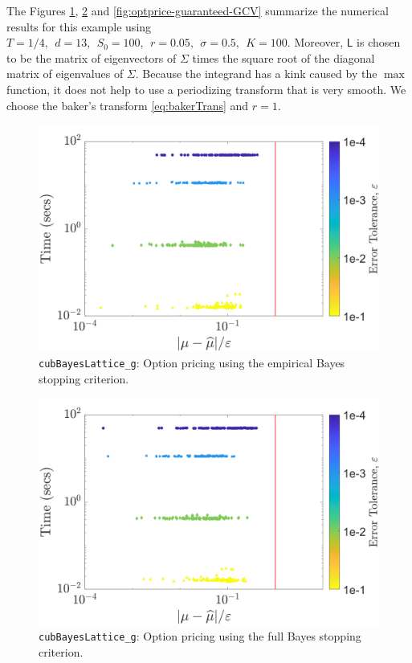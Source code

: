 \documentclass{iitthesis}          %
\newcommand{\mSigma}{\mathsf{\Sigma}}
\newcommand{\mL}{\mathsf{L}}
\newcommand{\code}[1]{\texttt{#1}}
\begin{document}
The Figures \ref{fig:optprice-guaranteed-MLE}, \ref{fig:optprice-guaranteed-FB} and 
\ref{fig:optprice-guaranteed-GCV} summarize the numerical results for this example using
$
T = 1/4, \ \ d = 13, \ \ S_0 = 100, \ \ r =  0.05, \ \ \sigma = 0.5, \ \ K = 100.
$
Moreover, $\mL$ is chosen to be the matrix of eigenvectors of $\mSigma$ times the square root of the diagonal matrix of eigenvalues of $\mSigma$.
Because the integrand has a kink caused by the $\max$ function, it does not help to use a periodizing transform that is very smooth.  We choose the baker's transform \eqref{eq:bakerTrans} and $r = 1$.

\begin{figure}
	\centering
	\includegraphics[width=0.95\linewidth]{"optPrice_guaranteed_time_MLE_Baker_d12_r1_2018-Sep-6"}
	\caption[Option pricing Guaranteed: MLE]{\code{cubBayesLattice\_g}: Option pricing using the empirical Bayes stopping criterion.}
	\label{fig:optprice-guaranteed-MLE}
\end{figure}
\begin{figure}
	\centering
	\includegraphics[width=0.95\linewidth]{"optPrice_guaranteed_time_full_Baker_d12_r1_2018-Sep-6"}
	\caption[OptPrice guaranteed : FB]{\code{cubBayesLattice\_g}: Option pricing using the full Bayes stopping criterion.}
	\label{fig:optprice-guaranteed-FB}
\end{figure}
\end{document}
